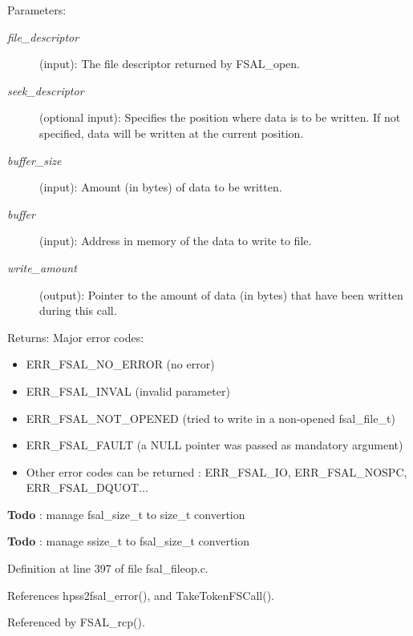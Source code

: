 \begin{Desc}
\item[Parameters:]
\begin{description}
\item[{\em file\_\-descriptor}](input): The file descriptor returned by FSAL\_\-open. \item[{\em seek\_\-descriptor}](optional input): Specifies the position where data is to be written. If not specified, data will be written at the current position. \item[{\em buffer\_\-size}](input): Amount (in bytes) of data to be written. \item[{\em buffer}](input): Address in memory of the data to write to file. \item[{\em write\_\-amount}](output): Pointer to the amount of data (in bytes) that have been written during this call.\end{description}
\end{Desc}
\begin{Desc}
\item[Returns:]Major error codes:\begin{itemize}
\item ERR\_\-FSAL\_\-NO\_\-ERROR (no error)\item ERR\_\-FSAL\_\-INVAL (invalid parameter)\item ERR\_\-FSAL\_\-NOT\_\-OPENED (tried to write in a non-opened fsal\_\-file\_\-t)\item ERR\_\-FSAL\_\-FAULT (a NULL pointer was passed as mandatory argument)\item Other error codes can be returned : ERR\_\-FSAL\_\-IO, ERR\_\-FSAL\_\-NOSPC, ERR\_\-FSAL\_\-DQUOT... \end{itemize}
\end{Desc}


\begin{Desc}
\item[{\bf Todo}]: manage fsal\_\-size\_\-t to size\_\-t convertion \end{Desc}


\begin{Desc}
\item[{\bf Todo}]: manage ssize\_\-t to fsal\_\-size\_\-t convertion \end{Desc}


Definition at line 397 of file fsal\_\-fileop.c.

References hpss2fsal\_\-error(), and TakeTokenFSCall().

Referenced by FSAL\_\-rcp().